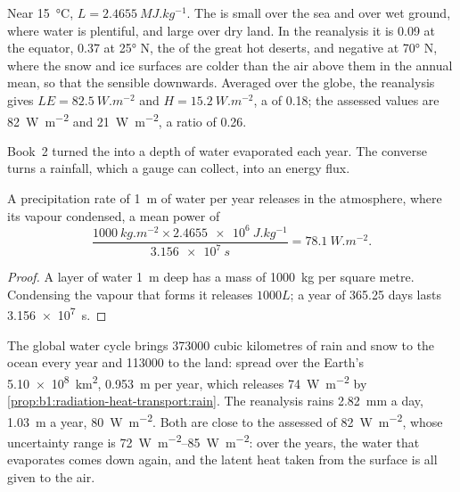 Near \qty{15}{\celsius}, $L = \qty{2.4655}{MJ.kg^{-1}}$. The  is small
over the sea and over wet ground, where water is plentiful, and large over dry land.
In the reanalysis it is \num{0.09} at the equator, \num{0.37} at \ang{25} N, the
 of the great hot deserts, and negative at \ang{70} N, where the snow and
ice surfaces are colder than the air above them in the annual mean, so that the
sensible  downwards. Averaged over the globe, the reanalysis gives $LE =
\qty{82.5}{W.m^{-2}}$ and $H = \qty{15.2}{W.m^{-2}}$, a  of \num{0.18};
the assessed values are \qty{82}{W.m^{-2}} and \qty{21}{W.m^{-2}}, a ratio of
\num{0.26}.

Book~2 turned the  into a depth of water evaporated each year. The
converse turns a rainfall, which a gauge can collect, into an energy flux.

\begin{proposition}\label{prop:b1:radiation-heat-transport:rain}
A precipitation rate of \qty{1}{m} of water per year releases in the atmosphere,
where its vapour condensed, a mean power of
\[
  \frac{\qty{1000}{kg.m^{-2}} \times \qty{2.4655e6}{J.kg^{-1}}}{\qty{3.156e7}{s}}
  = \qty{78.1}{W.m^{-2}} .
\]
\end{proposition}

\begin{proof}
A layer of water \qty{1}{m} deep has a mass of \qty{1000}{kg} per square metre.
Condensing the vapour that forms it releases $1000L$; a year of \num{365.25} days
lasts \qty{3.156e7}{s}.
\end{proof}

\begin{example}\label{ex:b1:radiation-heat-transport:rain}
The global water cycle brings \num{373000} cubic kilometres of rain and snow to the
ocean every year and \num{113000} to the land: spread over the Earth's
\qty{5.10e8}{km^2}, \qty{0.953}{m} per year, which releases
\qty{74}{W.m^{-2}} by \cref{prop:b1:radiation-heat-transport:rain}. The reanalysis
rains \qty{2.82}{mm} a day, \qty{1.03}{m} a year, \qty{80}{W.m^{-2}}. Both are close
to the assessed  of \qty{82}{W.m^{-2}}, whose uncertainty range is
\qtyrange{72}{85}{W.m^{-2}}: over the years, the water that evaporates comes down
again, and the latent heat taken from the surface is all given to the air.
\end{example}

